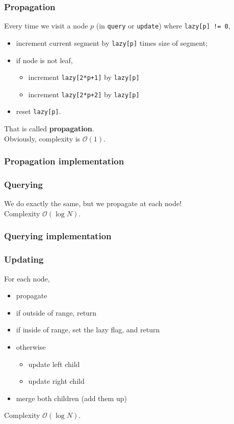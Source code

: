 \documentclass[12pt]{beamer}
\newcommand{\bigoh}{\mathcal{O}}
\begin{document}
\begin{frame}
    \frametitle{Propagation}
    Every time we visit a node $p$ (in \lstinline{query} or \lstinline{update}) where \lstinline{lazy[p] != 0},
    \begin{itemize}
        \item increment current segment by \lstinline{lazy[p]} times size of segment;
        \item if node is not leaf,
            \begin{itemize}
                \item increment \lstinline{lazy[2*p+1]} by \lstinline{lazy[p]}
                \item increment \lstinline{lazy[2*p+2]} by \lstinline{lazy[p]}
            \end{itemize}
        \item reset \lstinline{lazy[p]}.
    \end{itemize}
    That is called \textbf{propagation}. \\
    Obviously, complexity is $\bigoh(1)$.
\end{frame}

\begin{frame}
    \frametitle{Propagation implementation}
    
\end{frame}

\begin{frame}
    \frametitle{Querying}
    We do exactly the same, but we propagate at each node! \\
    Complexity $\bigoh(\log N)$.

\end{frame}

\begin{frame}
    \frametitle{Querying implementation}
    
\end{frame}

\begin{frame}
    \frametitle{Updating}
    For each node, 
    \begin{itemize}
        \item propagate
        \item if outside of range, return
        \item if inside of range, set the lazy flag, and return
        \item otherwise
            \begin{itemize}
                \item update left child
                \item update right child
            \end{itemize}
        \item merge both children (add them up)
    \end{itemize}
    Complexity $\bigoh(\log N)$.
\end{frame}
\end{document}

